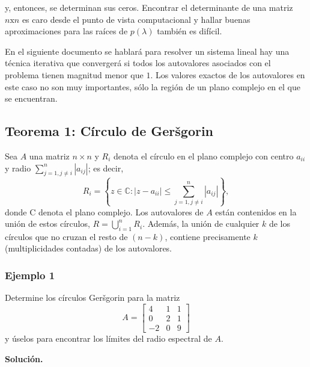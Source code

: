 \documentclass[12pt, a4paper]{article}
\numberwithin{subsection}{section} %
\begin{document}
        y, entonces, se determinan sus ceros. Encontrar el determinante de una matriz $ n\text{x}n $ es caro desde el punto de vista computacional y hallar buenas aproximaciones para las raíces de $ p \left( \lambda \right) $ también es difícil.
        
        En el siguiente documento se hablará para resolver un sistema lineal hay una técnica iterativa que convergerá si todos los autovalores asociados con el problema tienen magnitud menor que $ 1 $. Los valores exactos de los autovalores en este caso no son muy importantes, sólo la región de un plano complejo en el que se encuentran.
        
        \subsection{\textnormal{Teorema 1: Círculo de Geršgorin}}
        
        Sea $A$ una matriz $n\times n$ y $R_i$ denota el círculo en el plano complejo con centro $a_{ii}$ y radio $\sum_{j=1,j\neq i}^{n}\left| a_{ij} \right|$; es decir,
        \begin{equation}
        R_{i} = \left\{ z \in \mathbb{C} : \left| z - a_{ii} \right| \le \sum_{j=1,j\neq i}^{n}\left| a_{ij} \right| \right\},
        \end{equation}
        donde C denota el plano complejo. Los autovalores de $A$ están contenidos en la unión de estos círculos, $R=\bigcup_{i=1}^{n}R_{i}$. Además, la unión de cualquier $k$ de los círculos que no cruzan el resto de $\left( n - k \right)$, contiene precisamente $k$ (multiplicidades contadas) de los autovalores.
        
        \subsubsection*{Ejemplo 1}
        
        Determine los círculos Geršgorin para la matriz
        \begin{equation*}
        A =\begin{bmatrix}
        4 & 1 & 1 \\
        0 & 2 & 1 \\
        -2 & 0 & 9
        \end{bmatrix}
        \end{equation*}
        y úselos para encontrar los límites del radio espectral de $A$.
        
        {\bf Solución.}
        
\end{document}

